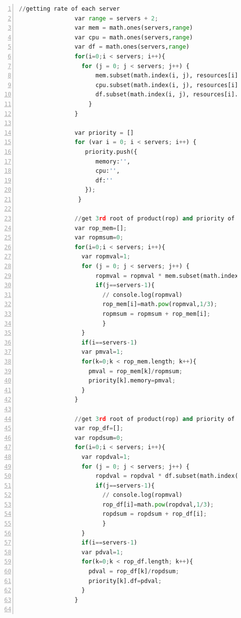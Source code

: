 \begin{lstlisting}[numbers=left, frame=single,tabsize=2,breaklines,caption={Kode sumber Model Auth},label=modelAuth, language=python]
                //getting rate of each server 
                var range = servers + 2;
                var mem = math.ones(servers,range)
                var cpu = math.ones(servers,range)
                var df = math.ones(servers,range)
                for(i=0;i < servers; i++){
                  for (j = 0; j < servers; j++) {
                      mem.subset(math.index(i, j), resources[i].memory/resources[j].memory)
                      cpu.subset(math.index(i, j), resources[i].cpu/resources[j].cpu)
                      df.subset(math.index(i, j), resources[i].df/resources[j].df)
                    }
                }

                var priority = []
                for (var i = 0; i < servers; i++) {
                   priority.push({
                      memory:'',
                      cpu:'',
                      df:''
                   });
                 } 

                //get 3rd root of product(rop) and priority of MEM
                var rop_mem=[];
                var ropmsum=0;
                for(i=0;i < servers; i++){
                  var ropmval=1;
                  for (j = 0; j < servers; j++) {
                      ropmval = ropmval * mem.subset(math.index(i, j))
                      if(j==servers-1){
                        // console.log(ropmval)
                        rop_mem[i]=math.pow(ropmval,1/3);
                        ropmsum = ropmsum + rop_mem[i];
                        }   
                  }
                  if(i==servers-1)
                  var pmval=1;
                  for(k=0;k < rop_mem.length; k++){
                    pmval = rop_mem[k]/ropmsum;
                    priority[k].memory=pmval;
                  }
                }

                //get 3rd root of product(rop) and priority of DF
                var rop_df=[];
                var ropdsum=0;
                for(i=0;i < servers; i++){
                  var ropdval=1;
                  for (j = 0; j < servers; j++) {
                      ropdval = ropdval * df.subset(math.index(i, j))
                      if(j==servers-1){
                        // console.log(ropmval)
                        rop_df[i]=math.pow(ropdval,1/3);
                        ropdsum = ropdsum + rop_df[i];
                        }   
                  }
                  if(i==servers-1)
                  var pdval=1;
                  for(k=0;k < rop_df.length; k++){
                    pdval = rop_df[k]/ropdsum;
                    priority[k].df=pdval;
                  }
                }


\end{lstlisting}
